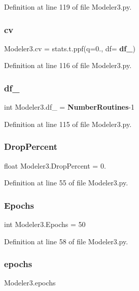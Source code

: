 Definition at line 119 of file Modeler3.\+py.

\mbox{\label{namespace_modeler3_a69db8b76e28840d6af81609f13c3bcfc}} 
\subsubsection{cv}
{\footnotesize\ttfamily Modeler3.\+cv = stats.\+t.\+ppf(q=0., df=\textbf{ df\+\_\+})}



Definition at line 116 of file Modeler3.\+py.

\mbox{\label{namespace_modeler3_a0e206528f1f62a6acd4605f102cdac54}} 
\subsubsection{df\+\_\+}
{\footnotesize\ttfamily int Modeler3.\+df\+\_\+ = \textbf{ Number\+Routines}-\/1}



Definition at line 115 of file Modeler3.\+py.

\mbox{\label{namespace_modeler3_a5f296f93c4ff79c56384b7b881a47a2b}} 
\subsubsection{Drop\+Percent}
{\footnotesize\ttfamily float Modeler3.\+Drop\+Percent = 0.}



Definition at line 55 of file Modeler3.\+py.

\mbox{\label{namespace_modeler3_ae1946367ea4e720d2b33d2a14d1f857a}} 
\subsubsection{Epochs}
{\footnotesize\ttfamily int Modeler3.\+Epochs = 50}



Definition at line 58 of file Modeler3.\+py.

\mbox{\label{namespace_modeler3_adc57d6fe14920c32689afb3bf1984d0e}} 
\subsubsection{epochs}
{\footnotesize\ttfamily Modeler3.\+epochs}



